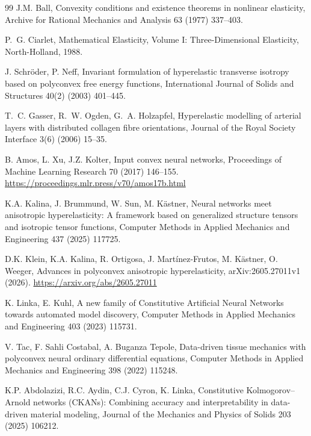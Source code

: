 \begin{thebibliography}{99}
J.M. Ball, Convexity conditions and existence theorems in nonlinear elasticity, Archive for Rational Mechanics and Analysis 63 (1977) 337--403.

P.~G. Ciarlet, Mathematical Elasticity, Volume I: Three-Dimensional
Elasticity, North-Holland, 1988.

J. Schr\"oder, P. Neff, Invariant formulation of hyperelastic
transverse isotropy based on polyconvex free energy functions,
International Journal of Solids and Structures 40(2) (2003) 401--445.

T.~C. Gasser, R.~W. Ogden, G.~A. Holzapfel, Hyperelastic modelling of
arterial layers with distributed collagen fibre orientations,
Journal of the Royal Society Interface 3(6) (2006) 15--35.

B. Amos, L. Xu, J.Z. Kolter, Input convex neural networks, Proceedings of Machine Learning Research 70 (2017) 146--155. \url{https://proceedings.mlr.press/v70/amos17b.html}

K.A. Kalina, J. Brummund, W. Sun, M. K\"astner,
Neural networks meet anisotropic hyperelasticity: A framework based on generalized structure tensors and isotropic tensor functions,
Computer Methods in Applied Mechanics and Engineering 437 (2025) 117725.

D.K. Klein, K.A. Kalina, R. Ortigosa, J. Mart\'inez-Frutos, M. K\"astner, O. Weeger, Advances in polyconvex anisotropic hyperelasticity, arXiv:2605.27011v1 (2026). \url{https://arxiv.org/abs/2605.27011}

K. Linka, E. Kuhl, A new family of Constitutive Artificial Neural
Networks towards automated model discovery,
Computer Methods in Applied Mechanics and Engineering 403 (2023) 115731.

V. Tac, F. Sahli Costabal, A. Buganza Tepole, Data-driven tissue
mechanics with polyconvex neural ordinary differential equations,
Computer Methods in Applied Mechanics and Engineering 398 (2022) 115248.

K.P. Abdolazizi, R.C. Aydin, C.J. Cyron, K. Linka,
Constitutive Kolmogorov--Arnold networks (CKANs): Combining accuracy and interpretability in data-driven material modeling,
Journal of the Mechanics and Physics of Solids 203 (2025) 106212.


\end{thebibliography}
